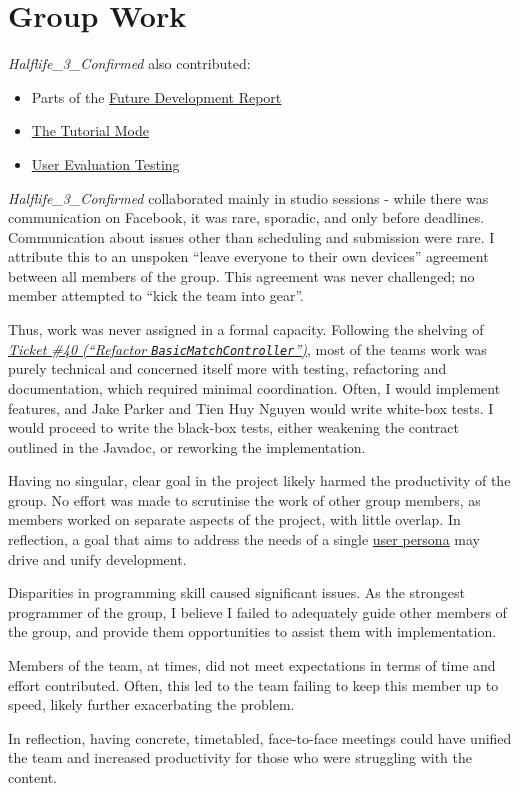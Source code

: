 \documentclass[11pt,a4paper]{report}
\begin{document}
\chapter{Group Work}


\textit{Halflife\_3\_Confirmed} also contributed:

\begin{itemize}
    \item Parts of the \href{https://github.com/UQdeco2800/deco2800-2016-pyramidscheme/wiki/Future-Development}{Future Development Report}
    \item \href{https://github.com/UQdeco2800/deco2800-2016-pyramidscheme/wiki/Team-Half_Life_3_Confirmed-Checkpoint-2-General}{The Tutorial Mode}
    \item \href{https://github.com/UQdeco2800/deco2800-2016-pyramidscheme/wiki/Team-Half_Life_3_Confirmed-Checkpoint-2-General}{User Evaluation Testing}
\end{itemize}

\textit{Halflife\_3\_Confirmed} collaborated mainly in studio sessions - while there was communication on Facebook, it was rare, sporadic, and only before deadlines. Communication about issues other than scheduling and submission were rare. I attribute this to an unspoken ``leave everyone to their own devices'' agreement between all members of the group. This agreement was never challenged; no member attempted to ``kick the team into gear''.

Thus, work was never assigned in a formal capacity. Following the shelving of \href{https://github.com/UQdeco2800/deco2800-2016-pyramidscheme/issues/40}{\textit{Ticket \#40 (``Refactor \texttt{BasicMatchController}'')}}, most of the teams work was purely technical and concerned itself more with testing, refactoring and documentation, which required minimal coordination. Often, I would implement features, and Jake Parker and Tien Huy Nguyen would write white-box tests. I would proceed to write the black-box tests, either weakening the contract outlined in the Javadoc, or reworking the implementation.

Having no singular, clear goal in the project likely harmed the productivity of the group. No effort was made to scrutinise the work of other group members, as members worked on separate aspects of the project, with little overlap. In reflection, a goal that aims to address the needs of a single \href{https://en.wikipedia.org/wiki/Persona_(user_experience)}{user persona} may drive and unify development.

Disparities in programming skill caused significant issues. As the strongest programmer of the group, I believe I failed to adequately guide other members of the group, and provide them opportunities to assist them with implementation.

Members of the team, at times, did not meet expectations in terms of time and effort contributed. Often, this led to the team failing to keep this member up to speed, likely further exacerbating the problem.

In reflection, having concrete, timetabled, face-to-face meetings could have unified the team and increased productivity for those who were struggling with the content.
\end{document}
